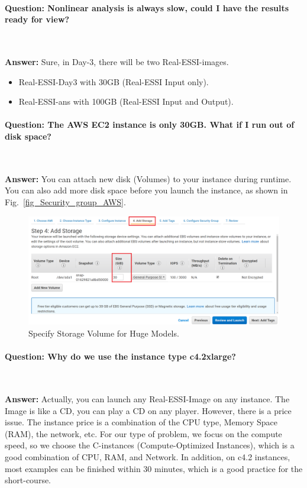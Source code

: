 \paragraph{Question: Nonlinear analysis is always slow, could I have the results ready for view?} ~

\textbf{Answer:} 
Sure, in Day-3, there will be two Real-ESSI-images.
\begin{itemize}
	\item Real-ESSI-Day3 with 30GB (Real-ESSI Input only).
	\item Real-ESSI-ans with 100GB (Real-ESSI Input and Output).
\end{itemize}



\paragraph{Question: The AWS EC2 instance is only 30GB. What if I run out of disk space?} ~

\textbf{Answer:} 
You can attach new disk (Volumes) to your instance during runtime. You can also add more disk space before you launch the instance, as shown in Fig.~\ref{fig_Security_group_AWS}.

\begin{figure}[H]
  \centering
  \includegraphics[width = 15cm]{./Figure-files/QA/specify_storage_time.png}
  \caption{Specify Storage Volume for Huge Models.}
  \label{fig_Specify_storage_model}
\end{figure}




\paragraph{Question: Why do we use the instance type c4.2xlarge?} ~

\textbf{Answer:} 
Actually, you can launch any Real-ESSI-Image on any instance. The Image is like a CD, you can play a CD on any player.
However, there is a price issue. The instance price is a combination of the CPU type, Memory Space (RAM), the network, etc. For our type of problem, we focus on the compute speed, so we choose the C-instances (Compute-Optimized Instances), which is a good combination of CPU, RAM, and Network. In addition, on c4.2 instances, most examples can be finished within 30 minutes, which is a good practice for the short-course. 


